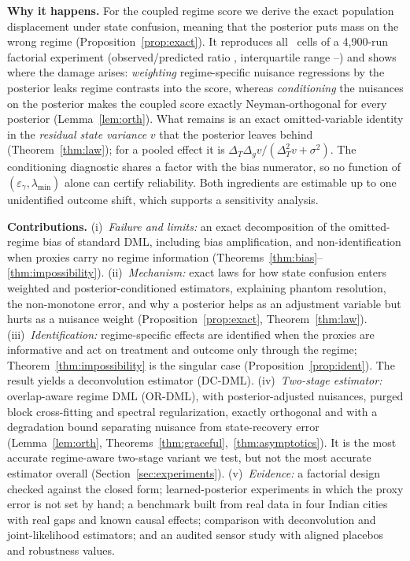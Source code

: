 \documentclass[twoside]{article}
\theoremstyle{definition}
\newcommand{\eps}{\varepsilon_\gamma}
\newcommand{\lmin}{\lambda_{\min}}
\begin{document}
\textbf{Why it happens.} For the coupled regime score we derive the exact population displacement under state confusion, meaning that the posterior puts mass on the wrong regime (Proposition~\ref{prop:exact}). It reproduces all \CFNCells\ cells of a 4,900-run factorial experiment (observed/predicted ratio \CFRatioMed, interquartile range \CFRatioLo--\CFRatioHi) and shows where the damage arises: \emph{weighting} regime-specific nuisance regressions by the posterior leaks regime contrasts into the score, whereas \emph{conditioning} the nuisances on the posterior makes the coupled score exactly Neyman-orthogonal for every posterior (Lemma~\ref{lem:orth}). What remains is an exact omitted-variable identity in the \emph{residual state variance} $v$ that the posterior leaves behind (Theorem~\ref{thm:law}); for a pooled effect it is $\Delta_T\Delta_g v/(\Delta_T^2v+\sigma^2)$. The conditioning diagnostic shares a factor with the bias numerator, so no function of $(\eps,\lmin)$ alone can certify reliability. Both ingredients are estimable up to one unidentified outcome shift, which supports a sensitivity analysis.

\textbf{Contributions.}
(i)~\emph{Failure and limits:} an exact decomposition of the omitted-regime bias of standard DML, including bias amplification, and non-identification when proxies carry no regime information (Theorems~\ref{thm:bias}--\ref{thm:impossibility}).
(ii)~\emph{Mechanism:} exact laws for how state confusion enters weighted and posterior-conditioned estimators, explaining phantom resolution, the non-monotone error, and why a posterior helps as an adjustment variable but hurts as a nuisance weight (Proposition~\ref{prop:exact}, Theorem~\ref{thm:law}).
(iii)~\emph{Identification:} regime-specific effects are identified when the proxies are informative and act on treatment and outcome only through the regime; Theorem~\ref{thm:impossibility} is the singular case (Proposition~\ref{prop:ident}). The result yields a deconvolution estimator (DC-DML).
(iv)~\emph{Two-stage estimator:} overlap-aware regime DML (OR-DML), with posterior-adjusted nuisances, purged block cross-fitting and spectral regularization, exactly orthogonal and with a degradation bound separating nuisance from state-recovery error (Lemma~\ref{lem:orth}, Theorems~\ref{thm:graceful},~\ref{thm:asymptotics}). It is the most accurate regime-aware two-stage variant we test, but not the most accurate estimator overall (Section~\ref{sec:experiments}).
(v)~\emph{Evidence:} a factorial design checked against the closed form; learned-posterior experiments in which the proxy error is not set by hand; a benchmark built from real data in four Indian cities with real gaps and known causal effects; comparison with deconvolution and joint-likelihood estimators; and an audited sensor study with aligned placebos and robustness values.
\end{document}

